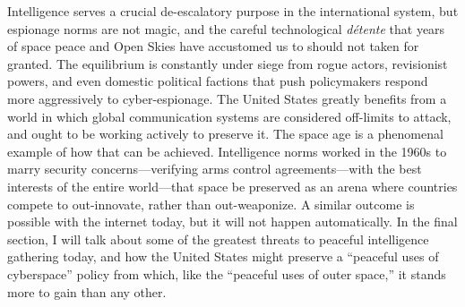 \documentclass[11pt]{memoir}
\begin{document}
Intelligence serves a crucial de-escalatory purpose in the international system, but espionage norms are not magic, and the careful technological \emph{d\'etente} that years of space peace and Open Skies have accustomed us to should not taken for granted. The equilibrium is constantly under siege from rogue actors, revisionist powers, and even domestic political factions that push policymakers respond more aggressively to cyber-espionage. The United States greatly benefits from a world in which global communication systems are considered off-limits to attack, and ought to be working actively to preserve it. The space age is a phenomenal example of how that can be achieved. Intelligence norms worked in the 1960s to marry security concerns---verifying arms control agreements---with the best interests of the entire world---that space be preserved as an arena where countries compete to out-innovate, rather than out-weaponize. A similar outcome is possible with the internet today, but it will not happen automatically. In the final section, I will talk about some of the greatest threats to peaceful intelligence gathering today, and how the United States might preserve a ``peaceful uses of cyberspace'' policy from which, like the ``peaceful uses of outer space,'' it stands more to gain than any other.


\newpage
\printbibliography[heading=subbibliography]
\end{document}
